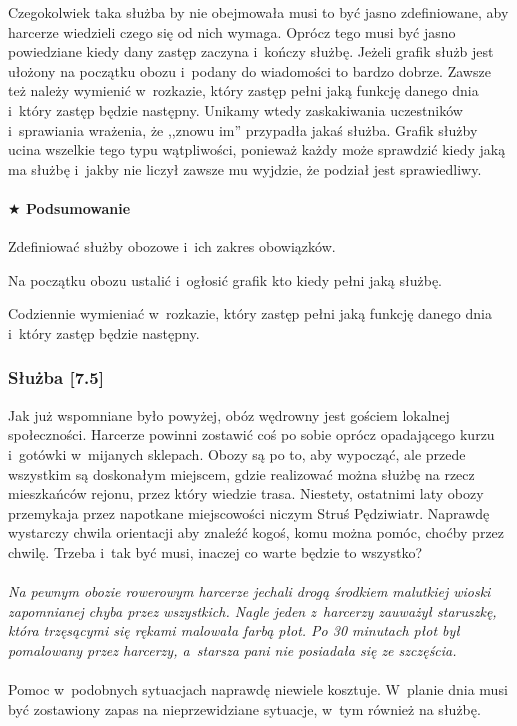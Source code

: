 \documentclass[a5paper,10pt,titlepage,twoside]{article}
\newcommand*{\thecheckbox}{\hss$\Box$} %
\newenvironment*{checklist}
{\list{}{%
\renewcommand*{\makelabel}[1]{\thecheckbox}}}
{\endlist}
\begin{document}
Czegokolwiek taka służba by nie obejmowała musi to być jasno zdefiniowane, aby harcerze wiedzieli czego się od nich wymaga. Oprócz tego musi być jasno powiedziane kiedy dany zastęp zaczyna i~kończy służbę. Jeżeli grafik służb jest ułożony na początku obozu i~podany do wiadomości to bardzo dobrze. Zawsze też należy wymienić w~rozkazie, który zastęp pełni jaką funkcję danego dnia i~który zastęp będzie następny. Unikamy wtedy zaskakiwania uczestników i~sprawiania wrażenia, że ,,znowu im'' przypadła jakaś służba. Grafik służby ucina wszelkie tego typu wątpliwości, ponieważ każdy może sprawdzić kiedy jaką ma służbę i~jakby nie liczył zawsze mu wyjdzie, że podział jest sprawiedliwy.
\paragraph{$\bigstar$ Podsumowanie}
\begin{checklist}
\item Zdefiniować służby obozowe i~ich zakres obowiązków.
\item Na początku obozu ustalić i~ogłosić grafik kto kiedy pełni jaką służbę.
\item Codziennie wymieniać w~rozkazie, który zastęp pełni jaką funkcję danego dnia i~który zastęp będzie następny.
\end{checklist}
\subsubsection{Służba [7.5]}
Jak już wspomniane było powyżej, obóz wędrowny jest gościem lokalnej społeczności. Harcerze powinni zostawić coś po sobie oprócz opadającego kurzu i~gotówki w~mijanych sklepach. Obozy są po to, aby wypocząć, ale przede wszystkim są doskonałym miejscem, gdzie realizować można służbę na rzecz mieszkańców rejonu, przez który wiedzie trasa. Niestety, ostatnimi laty obozy przemykaja przez napotkane miejscowości niczym Struś Pędziwiatr. Naprawdę wystarczy chwila orientacji aby znaleźć kogoś, komu można pomóc, choćby przez chwilę. Trzeba i~tak być musi, inaczej co warte będzie to wszystko?
\\
\\
\small{
\emph{Na pewnym obozie rowerowym harcerze jechali drogą środkiem malutkiej wioski zapomnianej chyba przez wszystkich. Nagle jeden z~harcerzy zauważył staruszkę, która trzęsącymi się rękami malowała farbą płot. Po 30 minutach płot był pomalowany przez harcerzy, a~starsza pani nie posiadała się ze szczęścia.}}
\\
\\
Pomoc w~podobnych sytuacjach naprawdę niewiele kosztuje. W~planie dnia musi być zostawiony zapas na nieprzewidziane sytuacje, w~tym również na służbę.
\end{document}
